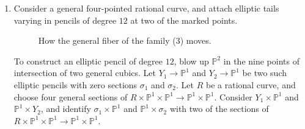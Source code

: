 \documentclass[10pt]{amsart}
\theoremstyle{definition}
\begin{document}
{\begin{enumerate}
Let $\pi_i\colon E_1\times E_2\rightarrow E_i$ be the projection on the $i$-th factor, for $i=1,2$. The non-zero restrictions of the divisor classes are
\begin{eqnarray*}
\psi_1 &=& -c_1\left(N_{\sigma_{\Delta_1}/\widetilde{E_1\times E_1}}\right) = \pi_1^*[p_1],\\
\psi_2 &=& -c_1\left(N_{\sigma_{\Delta_2}/\widetilde{E_2\times E_2}}\right) = \pi_2^*[p_2],\\
\delta_{1,1} &=& c_1\left(N_{\Gamma_1/\widetilde{E_1\times E_1}}\otimes N_{\Gamma_2/\widetilde{E_2\times E_2}}\right) = {}-\pi_1^*[p_1]-\pi_2^*[p_2],\\
\delta_{1,2} &=& \pi_1^*[p_1]+\pi_2^*[p_2].
\end{eqnarray*}
Hence, we obtain
\begin{align*}
 \psi_1\psi_2 &= 1, & \psi_1\delta_{1,1} = \psi_2\delta_{1,1}& = -1, & \psi_1\delta_{1,2} = \psi_2\delta_{1,2} &= 1. 
\end{align*}

A fiber of this family has an admissible cover of degree $d$ totally ramified at the two marked points if and only if $p_i-x_i$ is a non-trivial $d$-torsion point in $\textrm{Pic}^0(E_i)$, for $i=1,2$. For each such fiber $(C,x_1,x_2)$, the admissible cover $C\rightarrow D$ is unique. By the argument of \cite[Theorem 6]{MR664324}, the map from a neighborhood of the point $[C\rightarrow D]$ in the moduli space of admissible covers to the universal deformation space of $(C,x_1,x_2)$ is transverse to $\delta_{1,1}$. It follows that each fiber in the intersection of this family with $\overline{\mathcal{DR}}_2(d)$ counts with multiplicity one. We deduce
\[
A_{\psi_1\psi_2} -A_{\psi_1\delta_{1,1}} -A_{\psi_2\delta_{1,1}}+A_{\psi_1\delta_{1,2}}+A_{\psi_2\delta_{1,2}}= (d^2-1)^2.
\]

\item \label{2} Consider a general four-pointed rational curve, and attach elliptic tails varying in pencils of degree $12$ at two of the marked points.

\begin{figure}[htbp]
\centering
  
  

  \caption{How the general fiber of the family (3) moves.}
\end{figure}

To construct an elliptic pencil of degree $12$, blow up $\mathbb{P}^2$ in the nine points of intersection of two general cubics. Let $Y_1\rightarrow \mathbb{P}^1$ and $Y_2\rightarrow \mathbb{P}^1$ be two such elliptic pencils with zero sections $\sigma_1$ and $\sigma_2$. Let $R$ be a rational curve, and choose four general sections of $R\times\mathbb{P}^1\times\mathbb{P}^1\rightarrow \mathbb{P}^1\times\mathbb{P}^1$. Consider $Y_1\times \mathbb{P}^1$ and $\mathbb{P}^1\times Y_2$, and identify $\sigma_1\times\mathbb{P}^1$ and $\mathbb{P}^1\times\sigma_2$ with two of the sections of $R\times\mathbb{P}^1\times\mathbb{P}^1\rightarrow \mathbb{P}^1\times\mathbb{P}^1$. 


\end{enumerate}}
\end{document}

